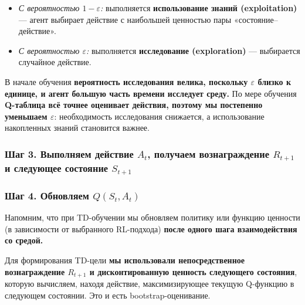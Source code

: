 \documentclass[11pt,a4paper]{article}
\begin{document}
\begin{itemize}
\tightlist
\item
  \emph{С вероятностью \(1-\varepsilon\):} выполняется \textbf{использование знаний (exploitation)} --- агент выбирает действие с наибольшей ценностью пары «состояние--действие».
\item
  \emph{С вероятностью \(\varepsilon\):} выполняется \textbf{исследование (exploration)} --- выбирается случайное действие.
\end{itemize}

В начале обучения \textbf{вероятность исследования велика, поскольку \(\varepsilon\) близко к единице, и агент большую часть времени исследует среду.} По мере обучения \textbf{Q-таблица всё точнее оценивает действия, поэтому мы постепенно уменьшаем \(\varepsilon\)}: необходимость исследования снижается, а использование накопленных знаний становится важнее.


\subsubsection{\texorpdfstring{Шаг 3. Выполняем действие \(A_t\), получаем вознаграждение \(R_{t+1}\) и следующее состояние \(S_{t+1}\)}{Шаг 3. Выполняем действие At, получаем вознаграждение R(t+1) и следующее состояние S(t+1)}}\label{step-3-perform-action-at-get-reward-rt1-and-next-state-st1}


\subsubsection{\texorpdfstring{Шаг 4. Обновляем \(Q(S_t,A_t)\)}{Шаг 4. Обновляем Q(St,At)}}\label{step-4-update-qst-at}

Напомним, что при TD-обучении мы обновляем политику или функцию ценности (в зависимости от выбранного RL-подхода) \textbf{после одного шага взаимодействия со средой.}

Для формирования TD-цели \textbf{мы использовали непосредственное вознаграждение \(R_{t+1}\) и дисконтированную ценность следующего состояния}, которую вычисляем, находя действие, максимизирующее текущую Q-функцию в следующем состоянии. Это и есть bootstrap-оценивание.
\end{document}
